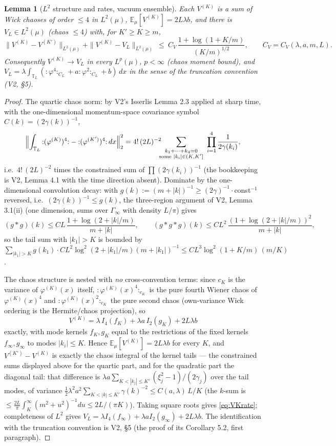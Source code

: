 \documentclass[11pt,a4paper]{article}
\theoremstyle{plain}
\newtheorem{lemma}[theorem]{Lemma}
\theoremstyle{definition}
\newcommand{\T}{\mathbb{T}}
\newcommand{\E}{\mathbb{E}}
\newcommand{\muv}{\mu}
\begin{document}
\begin{lemma}[$L^2$ structure and rates, vacuum ensemble]\label{lem:VL2}
Each $V^{(K)}$ is a sum of Wick chaoses of order $\le4$ in $L^2(\muv)$,
$\E_\muv[V^{(K)}]=2L\lambda b$, and there is $V_L\in L^2(\muv)$ (chaos
$\le4$) with, for $K'\ge K\ge m$,
\begin{equation}
 \|V^{(K)}-V^{(K')}\|_{L^2(\muv)}
 +\|V^{(K)}-V_L\|_{L^2(\muv)}
 \ \le\ C_V\,\frac{1+\log(1+K/m)}{(K/m)^{1/2}},
 \qquad C_V=C_V(\lambda,a,m,L).
 \label{eq:VKrate}
\end{equation}
Consequently $V^{(K)}\to V_L$ in every $L^p(\muv)$, $p<\infty$ (chaos
moment bound), and $V_L=\lambda\int_{\T_L}({:}\varphi^4{:}_{C_L}
+a{:}\varphi^2{:}_{C_L}+b)\,dx$ in the sense of the truncation convention
(V2, \S5).
\end{lemma}

\begin{proof}
The quartic chaos norm: by V2's Isserlis Lemma 2.3 applied at sharp time,
with the one-dimensional momentum-space covariance symbol
$\hat C(k)=(2\gamma(k))^{-1}$,
\[
 \Bigl\|\int_{\T_L}{:}(\varphi^{(K)})^4{:}-{:}(\varphi^{(K')})^4{:}\,dx
 \Bigr\|_2^2
 =4!\,(2L)^{-2}\!\!\!\sum_{\substack{k_1+\dots+k_4=0\\
 \text{some }|k_i|\in(K,K']}}\ \prod_{i=1}^4\frac1{2\gamma(k_i)},
\]
i.e.\ $4!\,(2L)^{-2}$ times the constrained sum of
$\prod(2\gamma(k_i))^{-1}$ (the bookkeeping is V2, Lemma 4.1 with the
time direction absent). Dominate by the one-dimensional convolution
decay: with $g(k):=(m+|k|)^{-1}\ge(2\gamma)^{-1}\cdot$const$^{-1}$
reversed, i.e.\ $(2\gamma(k))^{-1}\le g(k)$, the three-region argument of
V2, Lemma 3.1(ii) (one dimension, sums over $\Gamma_\infty$ with density
$L/\pi$) gives
\[
 (g*g)(k)\le C L\,\frac{1+\log(2+|k|/m)}{m+|k|},\qquad
 (g*g*g)(k)\le C L^2\,\frac{(1+\log(2+|k|/m))^2}{m+|k|},
\]
so the tail sum with $|k_1|>K$ is bounded by
$\sum_{|k_1|>K}g(k_1)\cdot CL^2\log^2(2+|k_1|/m)(m+|k_1|)^{-1}
\le CL^3\log^2(1+K/m)\,(m/K)$.

The chaos structure is nested with \emph{no} cross-convention terms:
since $c_K$ is the variance of $\varphi^{(K)}(x)$ itself,
${:}\varphi^{(K)}(x)^4{:}_{c_K}$ is the pure fourth Wiener chaos of
$\varphi^{(K)}(x)^4$ and ${:}\varphi^{(K)}(x)^2{:}_{c_K}$ the pure second
chaos (own-variance Wick ordering is the Hermite/chaos projection), so
\[
 V^{(K)}=\lambda\,I_4(f_K)+\lambda a\,I_2(g_K)+2L\lambda b
\]
exactly, with mode kernels $f_K,g_K$ equal to the restrictions of the
fixed kernels $f_\infty,g_\infty$ to modes $|k_i|\le K$. Hence
$\E_\muv[V^{(K)}]=2L\lambda b$ for every $K$, and
$V^{(K')}-V^{(K)}$ is exactly the chaos integral of the kernel tails ---
the constrained sums displayed above for the quartic part, and for the
quadratic part the diagonal tail: that difference is
$\lambda a\sum_{K<|k_j|\le K'}(\xi_j^2-1)/(2\gamma_j)$ over the tail
modes, of variance
$\tfrac12\lambda^2a^2\sum_{K<|k|\le K'}\gamma(k)^{-2}
\le C(a,\lambda)\,L/K$ (the $k$-sum is
$\le\tfrac{2L}\pi\int_K^\infty(m^2+u^2)^{-1}du\le2L/(\pi K)$). Taking square
roots gives \eqref{eq:VKrate}; completeness of $L^2$ gives
$V_L=\lambda I_4(f_\infty)+\lambda aI_2(g_\infty)+2L\lambda b$. The
identification with the truncation convention is V2, \S5 (the proof of
its Corollary 5.2, first paragraph).
\end{proof}
\end{document}
